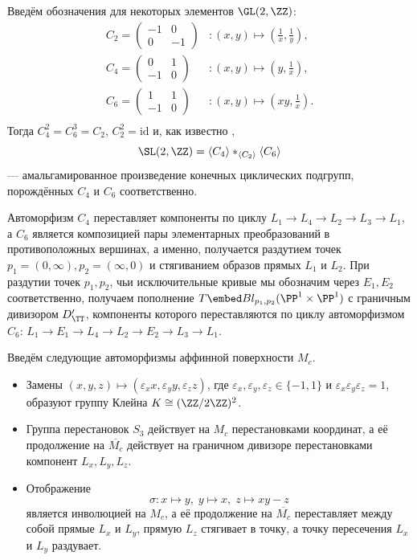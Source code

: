 Введём обозначения для некоторых элементов $\GL(2,\ZZ)$:
\begin{align*}
C_2=\begin{pmatrix}-1&0\\0&-1\end{pmatrix}&\colon(x,y)\mapsto\left(\frac{1}{x},\frac{1}{y}\right), \\    
C_4=\begin{pmatrix}0&1\\-1&0\end{pmatrix}&\colon(x,y)\mapsto\left(y,\frac{1}{x}\right), \\    
C_6=\begin{pmatrix}1&1\\-1&0\end{pmatrix}&\colon(x,y)\mapsto\left(xy,\frac{1}{x}\right). \\    
\end{align*}
Тогда $C_4^2=C_6^3=C_2$, $C_2^2=\mathrm{id}$ и, как известно \cite[Proposition 2.1]{BCCPS12}, \[\SL(2,\ZZ)=\langle C_4\rangle *_{\langle C_2 \rangle} \langle C_6\rangle\] --- амальгамированное произведение конечных циклических подгрупп, порождённых $C_4$ и $C_6$ соответственно.  




 Автоморфизм $C_4$ переставляет компоненты по циклу $L_1\to L_4\to L_2\to L_3\to L_1$, а $C_6$ является композицией пары элементарных преобразований в противоположных вершинах, а именно,
 получается раздутием точек $p_1=(0,\infty), p_2=(\infty,0)$ и стягиванием образов прямых $L_1$ и $L_2$. При раздутии точек $p_1,p_2$, чьи исключительные кривые мы обозначим через $E_1,E_2$ соответственно, получаем пополнение $T\embed  Bl_{p_1,p_2}(\PP^1\times\PP^1)$ с граничным дивизором $D_\TT'$, компоненты которого переставляются по циклу автоморфизмом $C_6$: $L_1\to E_1\to L_4\to L_2\to E_2\to L_3\to L_1$.


Введём следующие автоморфизмы аффинной поверхности $M_c$.
\begin{itemize}
    \item Замены $(x,y,z)\mapsto (\varepsilon_x x, \varepsilon_y y, \varepsilon_z z)$, где $\varepsilon_x,\varepsilon_y,\varepsilon_z\in\{-1,1\}$ и $\varepsilon_x\varepsilon_y\varepsilon_z=1$, образуют группу Клейна $K\cong(\ZZ/2\ZZ)^2$.
    \item Группа перестановок $S_3$ действует на $M_c$ перестановками координат, а её продолжение на $\overline{M_c}$ действует на граничном дивизоре перестановками компонент  $L_x, L_y, L_z$.
    \item  Отображение 
    \[\sigma\colon x\mapsto y,\; y\mapsto x,\; z\mapsto xy-z\] 
    является инволюцией на $M_c$, а её продолжение на $\overline{M_c}$ переставляет между собой прямые $L_x$ и $L_y$, прямую $L_z$ стягивает в точку, а точку пересечения $L_x$ и $L_y$ раздувает.
\end{itemize}




